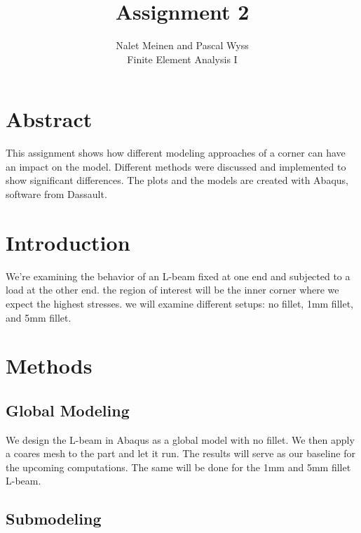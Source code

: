 \documentclass[12pt]{article}
\begin{document}


\title{Assignment 2}%
\author{Nalet Meinen and Pascal Wyss\\ %
Finite Element Analysis I
}

\maketitle
\section*{Abstract}
This assignment shows how different modeling approaches of a corner can have 
an impact on the model. Different methods were discussed and implemented to show 
significant differences. The plots and the models are created with Abaqus, 
software from Dassault.

\tableofcontents
\pagebreak
\section{Introduction}
We're examining the behavior of an L-beam fixed at one end and subjected 
to a load at the other end. the region of interest will be the inner 
corner where we expect the highest stresses. we will examine different 
setups: no fillet, 1mm fillet, and 5mm fillet.


\section{Methods}

\subsection{Global Modeling}

We design the L-beam in Abaqus as a global model with no fillet. We then apply 
a coares mesh to the part and let it run. The results will serve as our baseline 
for the upcoming computations. The same will be done for the 1mm and 5mm 
fillet L-beam.

\subsection{Submodeling}
\end{document}
